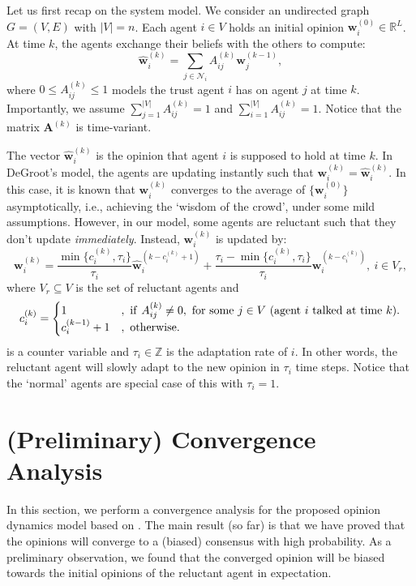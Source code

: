 \documentclass[letter]{article}
\theoremstyle{remark}
\begin{document}
Let us first recap on the system model.
We consider an undirected graph $G = (V,E)$ with $|V| = n$. Each agent $i \in V$ holds an initial opinion ${\bm w}_i^{(0)} \in \mathbb{R}^L$. At time $k$, the agents exchange their beliefs with the others to compute:
\begin{equation}\label{eq:op}
\hat{\bm w}_i^{(k)} = \sum_{j \in \mathcal{N}_i} A_{ij}^{(k)} {\bm w}_j^{(k-1)},
\end{equation}
where $0 \leq A_{ij}^{(k)} \leq 1$ models the trust agent $i$ has on agent $j$ at time $k$. Importantly, we assume $\sum_{j=1}^{|V|} A_{ij}^{(k)} = 1$ and $\sum_{i=1}^{|V|} A_{ij}^{(k)} = 1$. Notice that the matrix ${\bm A}^{(k)}$ is time-variant. 

The vector $\hat{\bm w}_i^{(k)}$ is the opinion that agent $i$ is supposed to hold at time $k$. In DeGroot's model, the agents are updating instantly such that ${\bm w}_i^{(k)} = \hat{\bm w}_i^{(k)} $. In this case, it is known that ${\bm w}_i^{(k)}$ converges to the average of $\{{\bm w}_i^{(0)} \}$ asymptotically, i.e., achieving the `wisdom of the crowd',  under some mild assumptions. 
However, in our model, some agents are reluctant such that they don't update \emph{immediately}. Instead, ${\bm w}_i^{(k)}$ is updated by:
\begin{equation} \label{eq:adapt}
{\bm w}_i^{(k)} = \frac{\min\{ c_i^{(k)}, \tau_i\} }{\tau_i} \hat{\bm w}_i^{(k - c_i^{(k)} + 1)} + \frac{\tau_i - \min\{ c_i^{(k)}, \tau_i\} }{\tau_i} {\bm w}_i^{(k-c_i^{(k)})},~i \in V_r,
\end{equation}
where $V_r \subseteq V$ is the set of reluctant agents and 
\[
c_i^{(k)} = \begin{cases}
1 &,~{\rm if}~A_{ij}^{(k)} \neq 0,~\text{for some}~j \in V~\text{(agent $i$ talked at time $k$)}. \\
c_i^{(k-1)} + 1 &,~{\rm otherwise}.
\end{cases}
\]
is a counter variable and $\tau_i \in \mathbb{Z}$ is the adaptation rate of $i$. In other words, the reluctant agent will slowly adapt to the new opinion in $\tau_i$ time steps. Notice that the `normal' agents are special case of this with $\tau_i = 1$. 

\section{(Preliminary) Convergence Analysis} 
In this section, we perform a convergence analysis for the proposed opinion dynamics model based on \cite{}. The main result (so far) is that we have proved that the opinions will  converge to a (biased) consensus with high probability. As a preliminary observation, we found that the converged opinion will be biased towards the initial opinions of the reluctant agent in expectation. 
\end{document}
